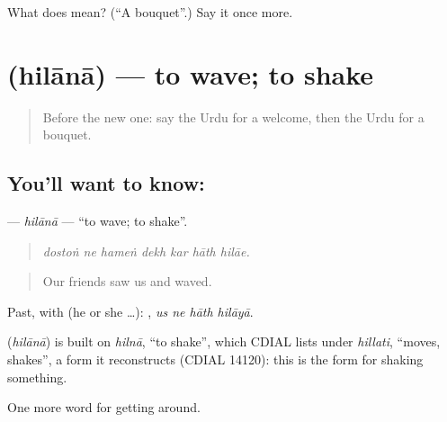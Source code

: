 \begin{tcolorbox}[breakable,colback=teal!4,colframe=teal!35!black,title={Before you move on}]
What does  mean? (\textquotedblleft{}A bouquet\textquotedblright{}.) Say it once more.
\end{tcolorbox}
\section[\texorpdfstring{\ur{ہلانا} (hilānā)}{ہلانا (hilānā)}]{ (hilānā) — to wave; to shake}

\label{lesson:UR-C401-hilana}



\begin{quote}
Before the new one: say the Urdu for a welcome, then the Urdu for a bouquet.
\end{quote}

\subsection*{You'll want to know: }
\textbf{} — \emph{hilānā} — \textquotedblleft{}to wave; to shake\textquotedblright{}.

\begin{quote}
      
\end{quote}

\begin{quote}
\emph{dostoṅ ne hameṅ dekh kar hāth hilāe.}
\end{quote}

\begin{quote}
Our friends saw us and waved.
\end{quote}

Past, with  (he or she …):    , \emph{us ne hāth hilāyā}.

\begin{cousinweb}
\textbf{} (\emph{hilānā}) is built on \emph{hilnā}, \textquotedblleft{}to shake\textquotedblright{}, which CDIAL lists under \emph{hillati}, \textquotedblleft{}moves, shakes\textquotedblright{}, a form it reconstructs (CDIAL 14120): this is the form for shaking something.
\end{cousinweb}

\begin{grammarlens}[title={What you've built}]
One more word for getting around.
\end{grammarlens}


